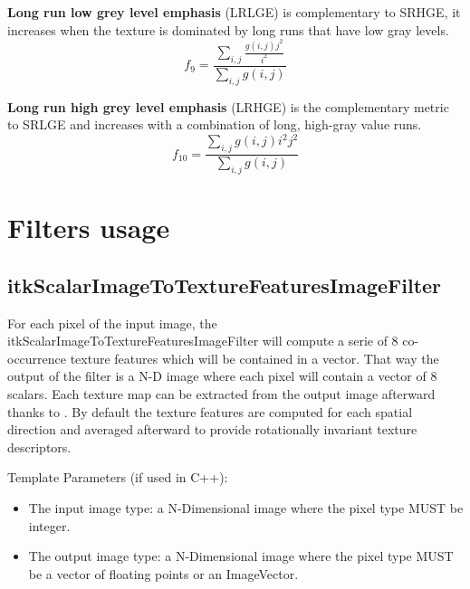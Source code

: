 \documentclass{InsightArticle}
\begin{document}
\textbf{Long run low grey level emphasis} (LRLGE) is complementary to SRHGE, it increases when the texture is dominated by long runs that have low gray levels.
\begin{equation} \label{eqn:ShapeInfluenceTerm}
f_9 = \frac{\sum_{i,j}\nolimits \frac{g(i, j)j^2}{i^2}}{\sum_{i,j}\nolimits g(i, j)}
\end{equation}

\textbf{Long run high grey level emphasis} (LRHGE) is the complementary metric to SRLGE and increases with a combination of long, high-gray value runs.
\begin{equation} \label{eqn:ShapeInfluenceTerm}
f_{10} = \frac{\sum_{i,j}\nolimits g(i, j)i^2j^2}{\sum_{i,j}\nolimits g(i, j)}
\end{equation}

\section{Filters usage}
\label{sec:filterUsage}

\subsection{itkScalarImageToTextureFeaturesImageFilter}
\label{sec:coocFilter}

For each pixel of the input image, the itkScalarImageToTextureFeaturesImageFilter will compute a serie of 8 co-occurrence texture features which will be contained in a vector. That way the output of the filter is a N-D image where each pixel will contain a vector of 8 scalars. Each texture map can be extracted from the output image afterward thanks to . By default the texture features are computed for each spatial direction and averaged afterward to provide rotationally invariant texture descriptors.

Template Parameters (if used in C++):
\begin{itemize}
 \item The input image type: a N-Dimensional image where the pixel type MUST be integer.
 \item The output image type: a N-Dimensional image where the pixel type MUST be a vector of floating points or an ImageVector.
\end{itemize}
\end{document}
